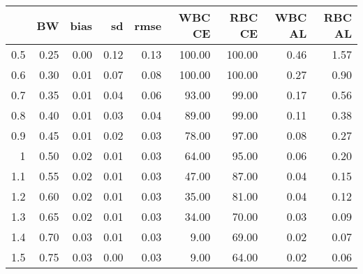 \begin{table}[ht]
\centering
\begin{tabular}{rrrrrrrrr}
  \hline
 & BW & bias & sd & rmse & WBC CE & RBC CE & WBC AL & RBC AL \\ 
  \hline
0.5 & 0.25 & 0.00 & 0.12 & 0.13 & 100.00 & 100.00 & 0.46 & 1.57 \\ 
  0.6 & 0.30 & 0.01 & 0.07 & 0.08 & 100.00 & 100.00 & 0.27 & 0.90 \\ 
  0.7 & 0.35 & 0.01 & 0.04 & 0.06 & 93.00 & 99.00 & 0.17 & 0.56 \\ 
  0.8 & 0.40 & 0.01 & 0.03 & 0.04 & 89.00 & 99.00 & 0.11 & 0.38 \\ 
  0.9 & 0.45 & 0.01 & 0.02 & 0.03 & 78.00 & 97.00 & 0.08 & 0.27 \\ 
  1 & 0.50 & 0.02 & 0.01 & 0.03 & 64.00 & 95.00 & 0.06 & 0.20 \\ 
  1.1 & 0.55 & 0.02 & 0.01 & 0.03 & 47.00 & 87.00 & 0.04 & 0.15 \\ 
  1.2 & 0.60 & 0.02 & 0.01 & 0.03 & 35.00 & 81.00 & 0.04 & 0.12 \\ 
  1.3 & 0.65 & 0.02 & 0.01 & 0.03 & 34.00 & 70.00 & 0.03 & 0.09 \\ 
  1.4 & 0.70 & 0.03 & 0.01 & 0.03 & 9.00 & 69.00 & 0.02 & 0.07 \\ 
  1.5 & 0.75 & 0.03 & 0.00 & 0.03 & 9.00 & 64.00 & 0.02 & 0.06 \\ 
   \hline
\end{tabular}
\end{table}
